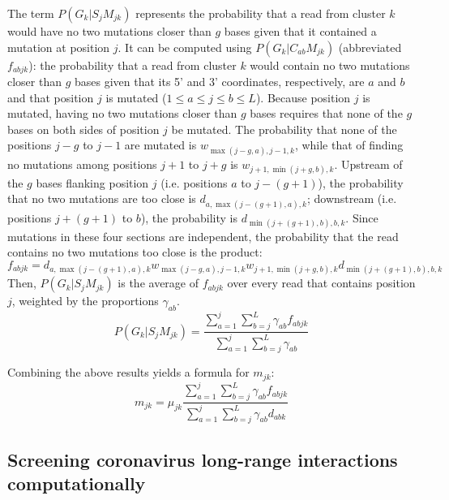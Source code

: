 \documentclass[main.tex]{subfiles}
\begin{document}
The term $P(G_k | S_j M_{jk})$ represents the probability that a read from cluster $k$ would have no two mutations closer than $g$ bases given that it contained a mutation at position $j$.
It can be computed using $P(G_k | C_{ab} M_{jk})$ (abbreviated $f_{abjk}$): the probability that a read from cluster $k$ would contain no two mutations closer than $g$ bases given that its 5' and 3' coordinates, respectively, are $a$ and $b$ and that position $j$ is mutated ($1 \le a \le j \le b \le L$).
Because position $j$ is mutated, having no two mutations closer than $g$ bases requires that none of the $g$ bases on both sides of position $j$ be mutated.
The probability that none of the positions $j - g$ to $j - 1$ are mutated is $w_{\max(j-g,a),j-1,k}$, while that of finding no mutations among positions $j + 1$ to $j + g$ is $w_{j+1,\min(j+g,b),k}$.
Upstream of the $g$ bases flanking position $j$ (i.e. positions $a$ to $j - (g + 1)$), the probability that no two mutations are too close is $d_{a,\max(j-(g+1),a),k}$; downstream (i.e. positions $j + (g + 1)$ to $b$), the probability is $d_{\min(j+(g+1),b),b,k}$.
Since mutations in these four sections are independent, the probability that the read contains no two mutations too close is the product:
$$f_{abjk} = d_{a,\max(j-(g+1),a),k} w_{\max(j-g,a),j-1,k} w_{j+1,\min(j+g,b),k} d_{\min(j+(g+1),b),b,k}$$
Then, $P(G_k | S_j M_{jk})$ is the average of $f_{abjk}$ over every read that contains position $j$, weighted by the proportions $\gamma_{ab}$.
$$P(G_k | S_j M_{jk}) = \frac{\sum_{a=1}^{j}\sum_{b=j}^{L}\gamma_{ab} f_{abjk}}{\sum_{a=1}^{j}\sum_{b=j}^{L}\gamma_{ab}}$$

Combining the above results yields a formula for $m_{jk}$:
$$m_{jk} = \mu_{jk} \frac{\sum_{a=1}^{j}\sum_{b=j}^{L}\gamma_{ab} f_{abjk}}{\sum_{a=1}^{j}\sum_{b=j}^{L}\gamma_{ab}d_{abk}}$$


\subsection{Screening coronavirus long-range interactions computationally}
\label{screen_lri_comp}
\end{document}

